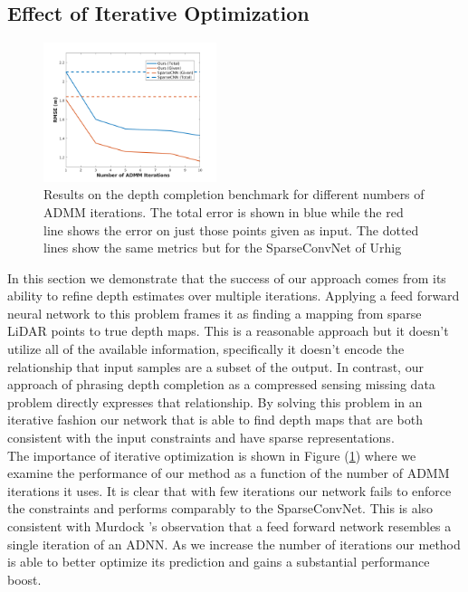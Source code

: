 \subsection{Effect of Iterative Optimization}
\label{sec:effect-iter-optim}
\begin{figure}
  \centering
  \includegraphics[width=0.45\textwidth]{iterplot}
  \caption{Results on the depth completion benchmark for different numbers of ADMM iterations. The total error is shown in blue while the red line shows the error on just those points given as input. The dotted lines show the same metrics but for the SparseConvNet of Urhig \etal}
  \label{fig:iterplot}
\end{figure}

In this section we demonstrate that the success of our approach comes from its ability to refine depth estimates over multiple iterations. Applying a feed forward neural network to this problem frames it as finding a mapping from sparse LiDAR points to true depth maps. This is a reasonable approach but it doesn't utilize all of the available information, specifically it doesn't encode the relationship that input samples are a subset of the output. In contrast, our approach of phrasing depth completion as a compressed sensing missing data problem directly expresses that relationship. By solving this problem in an iterative fashion our network that is able to find depth maps that are both consistent with the input constraints and have sparse representations.\\

The importance of iterative optimization is shown in Figure (\ref{fig:iterplot}) where we examine the performance of our method as a function of the number of ADMM iterations it uses. It is clear that with few iterations our network fails to enforce the constraints and performs comparably to the SparseConvNet. This is also consistent with Murdock \etal's observation that a feed forward network resembles a single iteration of an ADNN. As we increase the number of iterations our method is able to better optimize its prediction and gains a substantial performance boost.



